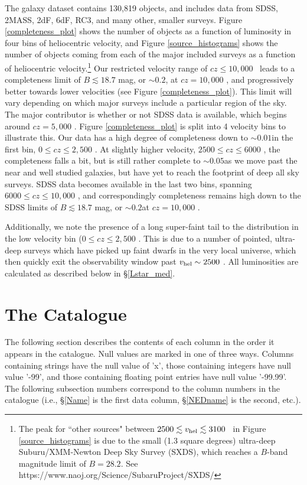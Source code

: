 The galaxy dataset contains 130,819  objects, and includes data from SDSS, 2MASS, 2dF, 6dF, RC3, and many other, smaller surveys. Figure \ref{completeness_plot} shows the number of objects as a function of luminosity in four bins of heliocentric velocity, and Figure \ref{source_histograms} shows the number of objects coming from each of the major included surveys as a function of heliocentric velocity.\footnote{The peak for ``other sources" between $2500 \lesssim v_{\rm hel} \lesssim 3100$ \kms~in Figure \ref{source_histograms} is due to the small (1.3 square degrees) ultra-deep Suburu/XMM-Newton Deep Sky Survey (SXDS), which reaches a $B$-band magnitude limit of $B=28.2$. See https://www.naoj.org/Science/SubaruProject/SXDS/} Our restricted velocity range of $cz \leq 10,000$ \kms~leads to a completeness limit of $B \lesssim 18.7$ mag, or $\sim0.2$\Lstar, at $cz = 10,000$ \kms, and progressively better towards lower velocities (see Figure \ref{completeness_plot}). This limit will vary depending on which major surveys include a particular region of the sky. The major contributor is whether or not SDSS data is available, which begins around $cz = 5,000$ \kms. Figure \ref{completeness_plot} is split into 4 velocity bins to illustrate this. Our data has a high degree of completeness down to $\sim0.01$\Lstar in the first bin, $0 \leq cz \leq 2,500$ \kms. At slightly higher velocity, $2500 \leq cz \leq 6000$ \kms, the completeness falls a bit, but is still rather complete to $\sim0.05$\Lstar as we move past the near and well studied galaxies, but have yet to reach the footprint of deep all sky surveys. SDSS data becomes available in the last two bins, spanning $6000 \leq cz \leq 10,000$ \kms, and correspondingly completeness remains high down to the SDSS limits of $B \lesssim 18.7$ mag, or $\sim0.2$\Lstar at $cz = 10,000$ \kms. 


Additionally, we note the presence of a long super-faint tail to the distribution in the low velocity bin ($0 \leq cz \leq 2,500$ \kms. This is due to a number of pointed, ultra-deep surveys which have picked up faint dwarfs in the very local universe, which then quickly exit the observability window past $v_{\rm hel} \sim 2500$ \kms. All luminosities are calculated as described below in \S \ref{Lstar_med}.




\section{The Catalogue}
The following section describes the contents of each column in the order it appears in the catalogue. Null values are marked in one of three ways. Columns containing strings have the null value of 'x', those containing integers have null value '-99', and those containing floating point entries have null value '-99.99'. The following subsection numbers correspond to the column numbers in the catalogue (i.e., \S \ref{Name} is the first data column, \S \ref{NEDname} is the second, etc.).

